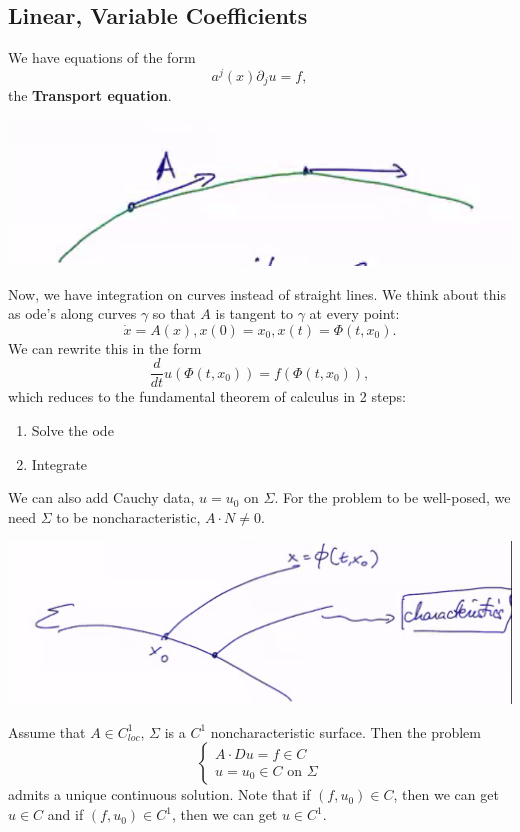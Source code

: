 \documentclass[11pt]{scrartcl}
\begin{document}
\subsection{Linear, Variable Coefficients}
We have equations of the form
$$a^j(x)\partial_j u = f,$$
the \textbf{Transport equation}. 
 \begin{center}
\includegraphics[scale=0.5]{curve.png}
\end{center}
Now, we have integration on curves instead of straight lines.  We think about this as ode's along curves $\gamma$ so that $A$ is tangent to $\gamma$ at every point: 
$$\dot{x} = A(x), x(0) = x_0, x(t) = \Phi(t, x_0).$$
We can rewrite this in the form
$$\frac{d}{dt} u(\Phi(t, x_0)) = f(\Phi(t, x_0)),$$
which reduces to the fundamental theorem of calculus in 2 steps:
\begin{enumerate}
\item Solve the ode
\item Integrate
\end{enumerate}
We can also add Cauchy data, $u = u_0$ on $\Sigma$.  For the problem to be well-posed, we need $\Sigma$ to be noncharacteristic, $A \cdot N \ne 0$.
 \begin{center}
\includegraphics[scale=0.5]{char.png}
\end{center}
\begin{thm} Assume that $A \in C_{loc}^1$, $\Sigma$ is a $C^1$ noncharacteristic surface.  Then the problem
$$\begin{cases}
A \cdot Du = f  \in C\\
u = u_0 \in C \text{ on } \Sigma
\end{cases}$$
admits a unique continuous solution.
Note that if $(f, u_0) \in C$, then we can get $u \in C$ and if $(f,u_0) \in C^1$, then we can get $u \in C^1$.
\end{thm}
\end{document}
